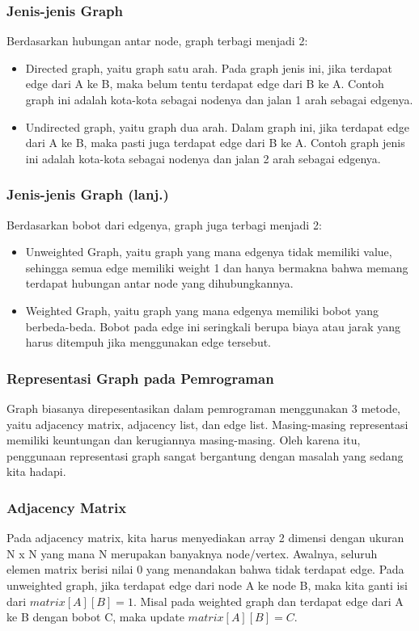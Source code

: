 \begin{frame}
\frametitle{Jenis-jenis Graph}
Berdasarkan hubungan antar node, graph terbagi menjadi 2:
\begin{itemize}
  \item Directed graph, yaitu graph satu arah. Pada graph jenis ini, jika terdapat edge dari A ke B, maka belum tentu terdapat edge dari B ke A. Contoh graph ini adalah kota-kota sebagai nodenya dan jalan 1 arah sebagai edgenya.
  \item Undirected graph, yaitu graph dua arah. Dalam graph ini, jika terdapat edge dari A ke B, maka pasti juga terdapat edge dari B ke A. Contoh graph jenis ini adalah kota-kota sebagai nodenya dan jalan 2 arah sebagai edgenya.
\end{itemize}
\end{frame}

\begin{frame}
\frametitle{Jenis-jenis Graph (lanj.)}
Berdasarkan bobot dari edgenya, graph juga terbagi menjadi 2:
\begin{itemize}
  \item Unweighted Graph, yaitu graph yang mana edgenya tidak memiliki value, sehingga semua edge memiliki weight 1 dan hanya bermakna bahwa memang terdapat hubungan antar node yang dihubungkannya.
  \item Weighted Graph, yaitu graph yang mana edgenya memiliki bobot yang berbeda-beda. Bobot pada edge ini seringkali berupa biaya atau jarak yang harus ditempuh jika menggunakan edge tersebut.
\end{itemize}
\end{frame}

\begin{frame}
\frametitle{Representasi Graph pada Pemrograman}

Graph biasanya direpesentasikan dalam pemrograman menggunakan 3 metode, yaitu adjacency matrix, adjacency list, dan edge list. Masing-masing representasi memiliki keuntungan dan kerugiannya masing-masing. Oleh karena itu, penggunaan representasi graph sangat bergantung dengan masalah yang sedang kita hadapi.
\end{frame}

\begin{frame}
\frametitle{Adjacency Matrix}

Pada adjacency matrix, kita harus menyediakan array 2 dimensi dengan ukuran N x N yang mana N merupakan banyaknya node/vertex. \newline\newline
Awalnya, seluruh elemen matrix berisi nilai 0 yang menandakan bahwa tidak terdapat edge. Pada unweighted graph, jika terdapat edge dari node A ke node B, maka kita ganti isi dari $matrix[A][B] = 1$. Misal pada weighted graph dan terdapat edge dari A ke B dengan bobot C, maka update $matrix[A][B] = C$.
\end{frame}

